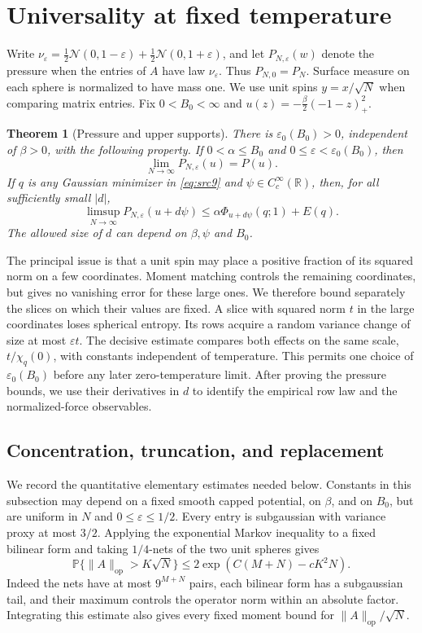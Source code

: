 \documentclass[11pt,a4paper]{article}
\numberwithin{equation}{section}
\newtheorem{theorem}{Theorem}[section]
\theoremstyle{definition}
\theoremstyle{remark}
\newcommand{\Prob}{\mathbb P}
\newcommand{\R}{\mathbb R}
\newcommand{\cN}{\mathcal N}
\newcommand{\eps}{\varepsilon}
\begin{document}
\section{Universality at fixed temperature}\label{sec:universality}

Write $\nu_\eps=\frac12\cN(0,1-\eps)+\frac12\cN(0,1+\eps)$, and let
$P_{N,\eps}(w)$ denote the pressure when the entries of $A$ have law
$\nu_\eps$.  Thus $P_{N,0}=P_N$. Surface measure on each sphere is normalized to
have mass one.  We use unit spins $y=x/\sqrt N$ when comparing
matrix entries.  Fix $0<B_0<\infty$ and $u(z)=-\frac\beta2(-1-z)_+^2$.

\begin{theorem}[Pressure and upper supports]\label{thm:univ-pressure}
There is $\eps_0(B_0)>0$, independent of $\beta>0$, with the following
property.  If $0<\alpha\le B_0$ and $0\le\eps<\eps_0(B_0)$, then
\[
 \lim_{N\to\infty}P_{N,\eps}(u)=P(u).
\]
If $q$ is any Gaussian minimizer in \eqref{eq:src9} and
$\psi\in C_c^\infty(\R)$, then, for all sufficiently small $|d|$,
\[
 \limsup_{N\to\infty}P_{N,\eps}(u+d\psi)
 \le \alpha\Phi_{u+d\psi}(q;1)+E(q).
\]
The allowed size of $d$ can depend on $\beta,\psi$ and $B_0$.
\end{theorem}

The principal issue is that a unit spin may place a positive fraction of
its squared norm on a few coordinates. Moment matching controls the
remaining coordinates, but gives no vanishing error for these large ones.
We therefore bound separately the slices on which their values are fixed.
A slice with squared norm $t$ in the large coordinates loses spherical
entropy. Its rows acquire a random variance change of size at most
$\eps t$. The decisive estimate compares both effects on the same scale,
$t/\chi_q(0)$, with constants independent of temperature. This permits
one choice of $\eps_0(B_0)$ before any later zero-temperature limit.
After proving the pressure bounds, we use their derivatives in $d$ to
identify the empirical row law and the normalized-force observables.

\subsection{Concentration, truncation, and replacement}

We record the quantitative elementary estimates needed below.  Constants
in this subsection may depend on a fixed smooth capped potential, on
$\beta$, and on $B_0$, but are uniform in $N$ and $0\le\eps\le1/2$.
Every entry is subgaussian with variance proxy at most $3/2$.  Applying the
exponential Markov inequality to a fixed bilinear form and taking
$1/4$-nets of the two unit spheres gives
\begin{equation}\label{eq:univ-opnorm}
 \Prob\{\|A\|_{\mathrm{op}}>K\sqrt N\}
 \le 2\exp(C(M+N)-cK^2N).
\end{equation}
Indeed the nets have at most $9^{M+N}$ pairs, each bilinear form has a
subgaussian tail, and their maximum controls the operator norm within an
absolute factor.  Integrating this estimate also gives every fixed moment
bound for $\|A\|_{\mathrm{op}}/\sqrt N$.
\end{document}
